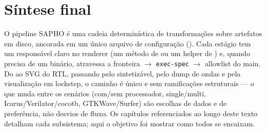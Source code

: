 \section{Síntese final}

O pipeline SAPHO é uma cadeia determinística de transformações sobre artefatos em
disco, ancorada em um único arquivo de configuração (). Cada estágio
tem um responsável claro no renderer (um método de  ou um
helper de ) e, quando precisa de um binário, atravessa
a fronteira  $\rightarrow$ \lstinline|exec-spec| $\rightarrow$
allowlist do main. Do \cmm{} ao SVG do RTL, passando pelo  sintetizável,
pelo dump de ondas e pela visualização em lockstep, o caminho é único e sem
ramificações estruturais — o que muda entre os cenários (com/sem processador,
single/multi, Icarus/Verilator/cocotb, GTKWave/Surfer) são escolhas de dados e de
preferência, não desvios de fluxo. Os capítulos referenciados ao longo deste texto
detalham cada subsistema; aqui o objetivo foi mostrar como todos se encaixam.
